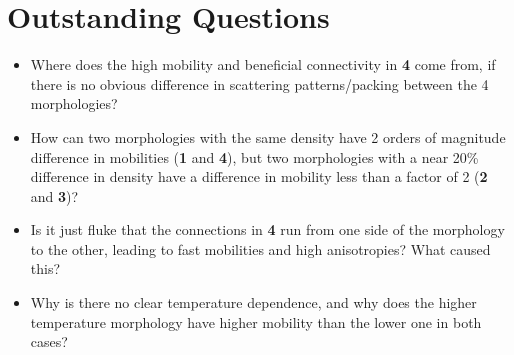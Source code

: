 \documentclass[12pt]{article}
\begin{document}
\section{Outstanding Questions}


\begin{itemize}
    \item{Where does the high mobility and beneficial connectivity in \textbf{4} come from, if there is no obvious difference in scattering patterns/packing between the 4 morphologies?}
    \item{How can two morphologies with the same density have 2 orders of magnitude difference in mobilities (\textbf{1} and \textbf{4}), but two morphologies with a near 20\% difference in density have a difference in mobility less than a factor of 2 (\textbf{2} and \textbf{3})?}
    \item{Is it just fluke that the connections in \textbf{4} run from one side of the morphology to the other, leading to fast mobilities and high anisotropies? What caused this?}
    \item{Why is there no clear temperature dependence, and why does the higher temperature morphology have higher mobility than the lower one in both cases?}
\end{itemize}




\end{document}
